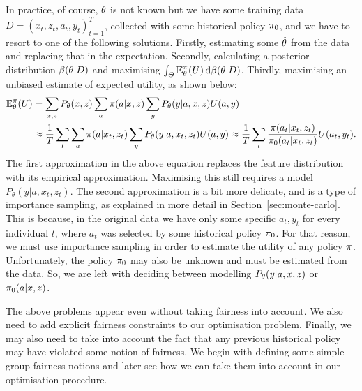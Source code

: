 \begin{frame}
{    
    In practice, of course, $\theta$ is not known but we have some training data $D = (x_t, z_t, a_t, y_t)_{t=1}^T$, collected with some historical policy $\pi_0$, and  we have to resort to one of the following solutions. Firstly, estimating some $\hat{\theta}$ from the data and replacing that in the expectation. Secondly, calculating a posterior distribution $\beta(\theta | D)$ and maximising $\int_\Theta \mathop{\mbox{\ensuremath{\mathbb{E}}}}\nolimits_\theta^\pi(U) \,\mathrm{d} \beta(\theta | D)$. Thirdly, maximising an unbiased estimate of expected utility, as shown below:
    \begin{align*}
      \mathop{\mbox{\ensuremath{\mathbb{E}}}}\nolimits^\pi_\theta(U)
      &=
        \sum_{x,z} P_\theta(x, z) \sum_a \pi(a | x, z) \sum_y P_\theta(y | a, x, z) U(a,y) \\
      &\approx
        \frac{1}{T} \sum_{t} \sum_a \pi(a | x_t, z_t) \sum_y P_\theta(y | a, x_t, z_t) U(a,y)
        \approx
        \frac{1}{T} \sum_{t} \frac{\pi(a_t | x_t, z_t)}{\pi_0(a_t | x_t, z_t)} U(a_t,y_t).
    \end{align*}
    The first approximation in the above equation replaces the feature distribution with its empirical approximation. Maximising this still requires a model $P_\theta(y | a, x_t, z_t)$.
    The second approximation is a bit more delicate, and is a type of importance sampling, as explained in more detail in Section~\ref{sec:monte-carlo}.
    This is because, in the original data we have only some specific $a_t, y_t$ for every individual $t$, where $a_t$ was selected by some historical policy $\pi_0$. For that reason, we must use importance sampling in order to estimate the utility of any policy $\pi$. Unfortunately, the policy $\pi_0$ may also be unknown and must be estimated from the data. So, we are left with deciding between modelling $P_\theta(y | a, x, z)$ or $\pi_0(a | x, z)$.

    The above problems appear even without taking fairness into account. We also need to add explicit fairness constraints to our optimisation problem. Finally, we may also need to take into account the fact that any previous historical policy may have violated some notion of fairness. We begin with defining some simple group fairness notions and later see how we can take them into account in our optimisation procedure.
  }
\end{frame}  

